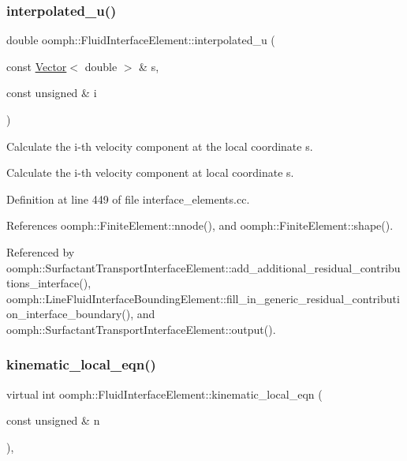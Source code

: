 \subsubsection{\texorpdfstring{interpolated\+\_\+u()}{interpolated\_u()}}
{\footnotesize\ttfamily double oomph\+::\+Fluid\+Interface\+Element\+::interpolated\+\_\+u (\begin{DoxyParamCaption}\item[{const \hyperlink{classoomph_1_1Vector}{Vector}$<$ double $>$ \&}]{s,  }\item[{const unsigned \&}]{i }\end{DoxyParamCaption})}



Calculate the i-\/th velocity component at the local coordinate s. 

Calculate the i-\/th velocity component at local coordinate s. 

Definition at line 449 of file interface\+\_\+elements.\+cc.



References oomph\+::\+Finite\+Element\+::nnode(), and oomph\+::\+Finite\+Element\+::shape().



Referenced by oomph\+::\+Surfactant\+Transport\+Interface\+Element\+::add\+\_\+additional\+\_\+residual\+\_\+contributions\+\_\+interface(), oomph\+::\+Line\+Fluid\+Interface\+Bounding\+Element\+::fill\+\_\+in\+\_\+generic\+\_\+residual\+\_\+contribution\+\_\+interface\+\_\+boundary(), and oomph\+::\+Surfactant\+Transport\+Interface\+Element\+::output().

\mbox{\label{classoomph_1_1FluidInterfaceElement_a58a82e2fd839d4381e43d46a22bf1f25}} 
\subsubsection{\texorpdfstring{kinematic\+\_\+local\+\_\+eqn()}{kinematic\_local\_eqn()}}
{\footnotesize\ttfamily virtual int oomph\+::\+Fluid\+Interface\+Element\+::kinematic\+\_\+local\+\_\+eqn (\begin{DoxyParamCaption}\item[{const unsigned \&}]{n }\end{DoxyParamCaption})\hspace{0.3cm}{\ttfamily [protected]}, {}}




